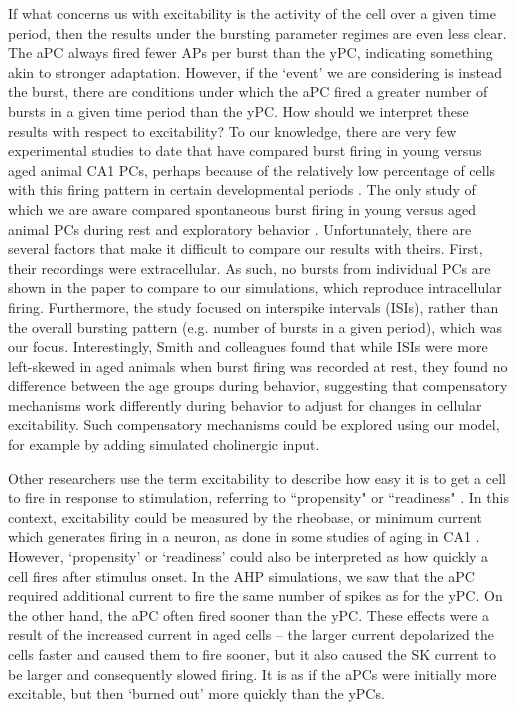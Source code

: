 \documentclass[12pt]{article}
\begin{document}
 If what concerns us with excitability is the activity of the cell over a given time period, then the results under the bursting parameter regimes are even less clear. The aPC always fired fewer APs per burst than the yPC, indicating something akin to stronger adaptation. However, if the `event' we are considering is instead the burst, there are conditions under which the aPC fired a greater number of bursts in a given time period than the yPC. How should we interpret these results with respect to excitability? To our knowledge, there are very few experimental studies to date that have compared burst firing in young versus aged animal CA1 PCs, perhaps because of the relatively low percentage of cells with this firing pattern in certain developmental periods \cite{chen2005transitional}. The only study of which we are aware compared spontaneous burst firing in young versus aged animal PCs during rest and exploratory behavior \cite{smith2000effect}. Unfortunately, there are several factors that make it difficult to compare our results with theirs. First, their recordings were extracellular. As such, no bursts from individual PCs are shown in the paper to compare to our simulations, which reproduce intracellular firing. Furthermore, the study focused on interspike intervals (ISIs), rather than the overall bursting pattern (e.g. number of bursts in a given period), which was our focus. Interestingly, Smith and colleagues \cite{smith2000effect} found that while ISIs were more left-skewed in aged animals when burst firing was recorded at rest, they found no difference between the age groups during behavior, suggesting that compensatory mechanisms work differently during behavior to adjust for changes in cellular excitability. Such compensatory mechanisms could be explored using our model, for example by adding simulated cholinergic input.     

Other researchers use the term excitability to describe how easy it is to get a cell to fire in response to stimulation, referring to ``propensity" \cite{daoudal2003long} or ``readiness" \cite{konstantinovic2019effects}. In this context, excitability could be measured by the rheobase, or minimum current which generates firing in a neuron, as done in some studies of aging in CA1 \cite{potier1993age}. However, `propensity' or `readiness' could also be interpreted as how quickly a cell fires after stimulus onset. In the AHP simulations, we saw that the aPC required additional current to fire the same number of spikes as for the yPC. On the other hand, the aPC often fired sooner than the yPC. These effects were a result of the increased {\Ca} current in aged cells -- the larger {\Ca} current depolarized the cells faster and caused them to fire sooner, but it also caused the SK current to be larger and consequently slowed firing. It is as if the aPCs were initially more excitable, but then `burned out' more quickly than the yPCs. 
\end{document}
